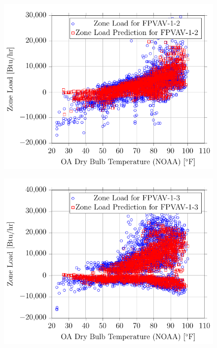 \begin{figure}
\centering
\includegraphics{Plots/27/2017-06-27-1356-BtuhrvsOADryBulbTemperatureNOAAF.pdf}
\caption{}
\label{fig:2017-06-27-1356-BtuhrvsOADryBulbTemperatureNOAAF}
\end{figure}

\begin{figure}
\centering
\includegraphics{Plots/28/2017-06-27-1357-BtuhrvsOADryBulbTemperatureNOAAF.pdf}
\caption{}
\label{fig:2017-06-27-1357-BtuhrvsOADryBulbTemperatureNOAAF}
\end{figure}

